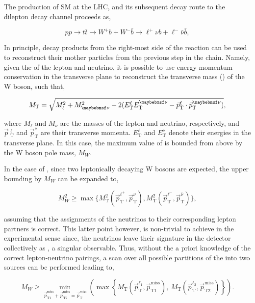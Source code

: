 The production of SM \ttbar at the LHC, and its subsequent decay route to the dilepton decay channel proceeds as,

\begin{equation}
pp \rightarrow t\bar{t} \rightarrow W^{+} b + W^{-} \bar{b} \rightarrow \ell^{+} \nu b + \ell^{-} \bar{\nu} \bar{b},
\label{eq:SMtt2l}
\end{equation}

In principle, decay products from the right-most side of the reaction can be used to reconstruct their mother particles from the previous step in the chain. Namely, given the \pt of the lepton and neutrino, it is possible to use energy-momentum conservation in the transverse plane to reconstruct the transverse mass (\mt) of the W boson, such that,

\begin{equation}
  \mt = \sqrt{M_{\ell}^{2} + M_{\nu}^{2} + 2(E_{\text{T}}^{\ell}E_{\text{T}}^{\nu} - \vec{p}_{\text{T}}^{\ell}\cdot\vec{p}_{\text{T}}^{\nu})},
  \label{eq:MT}
\end{equation}

where $M_{\ell}$ and $M_{\nu}$ are the masses of the lepton and neutrino, respectively, and $\vec{p}\
_{\text{T}}^{\ell}$ and $\vec{p}_{\text{T}}^{\nu}$ are their transverse momenta. $E_{\text{T}}^{\ell}$ and $E_{\text{T}}^{\nu}$ denote their energies in the transverse plane. In this case, the maximum value of \mt is bounded from above by the W boson pole mass, $M_W$.

In the case of \ttll, since two leptonically decaying W bosons are expected, the upper bounding by $M_W$ can be expanded to,

\begin{equation}
  M_{W}^{2} \geq \max{\{M_{\text{T}}^{2}\left(\vec{p}^{\ell^{+}}_{\text{T}}, \vec{p}^{\nu}_{\text{T}}\right), M_{\text{T}}^{2}\left(\vec{p}^{\ell^{-}}_{\text{T}}, \vec{p}^{\bar{\nu}}_{\text{T}}\right)\}},
\end{equation} 

assuming that the assignments of the neutrinos to their corresponding lepton partners is correct. This latter point however, is non-trivial to achieve in the experimental sense since, the neutrinos leave their signature in the detector collectively as \MET, a singular observable. Thus, without the a priori knowledge of the correct lepton-neutrino pairings, a scan over all possible partitions of the \ptvecmiss into two sources can be performed leading to,

\begin{equation}
  M_{W} \geq \min_{\vec{p}^{\text{miss}}_{\text{T1}}+\vec{p}^{\text{miss}}_{\text{T2}}=\vec{p}^{\text{miss}}_{\text{T}}}\left(\max\left\{M_{\text{T}}\left(\vec{p}^{\ell_1}_{\text{T}},\vec{p}^{\text{miss}}_{\text{T1}}\right),\:M_{\text{T}}\left(\vec{p}^{\ell_2}_{\text{T}},\vec{p}^{\text{miss}}_{\text{T2}}\right)\right\}\right).
\label{eq:mt2ll_1}
\end{equation}

